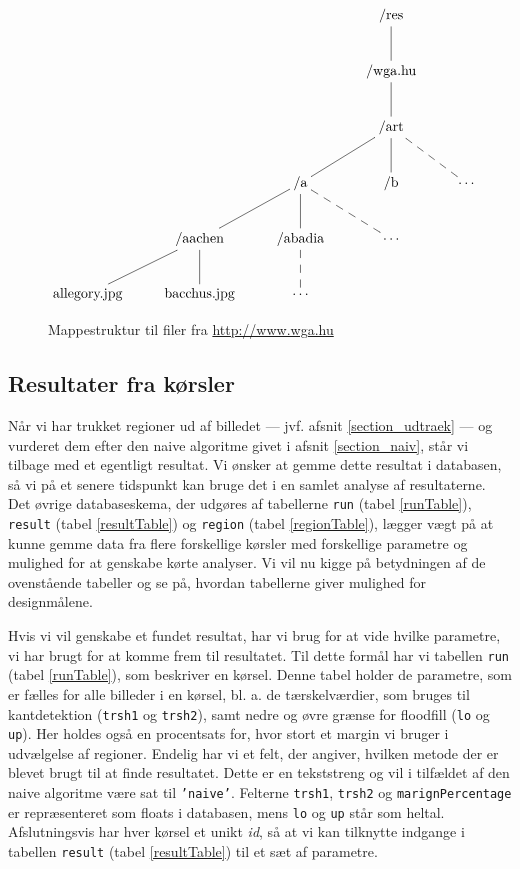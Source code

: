 {%
\begin{figure}[!h]
    \centering
$
\xymatrix{
 &  &   & \ar @{-} [d] \textrm{/res}  &                                                     \\
 &  &   & \ar @{-} [d] \textrm{/wga.hu}  &                                                  \\
 &  &   & \ar @{-} [dl] \ar @{-} [d] \ar @{--} [dr] \textrm{/art} &                         \\
 &  & \ar @{-} [dl] \ar @{-} [d] \ar @{--} [dr] \textrm{/a} & \textrm{/b} & \cdots          \\
 & \ar @{-} [dl] \ar @{-} [d] \textrm{/aachen} & \ar @{--} [d] \textrm{/abadia} & \cdots    \\
\textrm{allegory.jpg} & \textrm{bacchus.jpg} & \cdots &   &
}
$
    \caption{Mappestruktur til filer fra
        \href{http://www.wga.hu}{http://www.wga.hu}}
    \label{mappestruktur}
\end{figure}

\subsection{Resultater fra kørsler\label{section_results}}
Når vi har trukket regioner ud af billedet --- jvf. afsnit
\ref{section_udtraek} --- og vurderet dem efter den naive algoritme
givet i afsnit \ref{section_naiv}, står vi tilbage med et egentligt
resultat. Vi ønsker at gemme dette resultat i databasen, så vi på et
senere tidspunkt kan bruge det i en samlet analyse af resultaterne. Det
øvrige databaseskema, der udgøres af tabellerne \texttt{run} (tabel
\ref{runTable}), \texttt{result} (tabel \ref{resultTable}) og
\texttt{region} (tabel \ref{regionTable}), lægger vægt på at kunne gemme
data fra flere forskellige kørsler med forskellige parametre og mulighed
for at genskabe kørte analyser. Vi vil nu kigge på betydningen af de
ovenstående tabeller og se på, hvordan tabellerne giver mulighed for
designmålene.

Hvis vi vil genskabe et fundet resultat, har vi brug for at vide hvilke
parametre, vi har brugt for at komme frem til resultatet. Til dette
formål har vi tabellen \texttt{run} (tabel \ref{runTable}), som
beskriver en kørsel. Denne tabel holder de parametre, som er fælles for
alle billeder i en kørsel, bl. a. de tærskelværdier, som bruges til
kantdetektion (\texttt{trsh1} og \texttt{trsh2}), samt nedre og øvre
grænse for floodfill (\texttt{lo} og \texttt{up}). Her holdes også en
procentsats for, hvor stort et margin vi bruger i udvælgelse af
regioner. Endelig har vi et felt, der angiver, hvilken metode der er
blevet brugt til at finde resultatet. Dette er en tekststreng og vil i
tilfældet af den naive algoritme være sat til \texttt{'naive'}. Felterne
\texttt{trsh1}, \texttt{trsh2} og \texttt{marignPercentage} er
repræsenteret som floats i databasen, mens \texttt{lo} og \texttt{up}
står som heltal. Afslutningsvis har hver kørsel et unikt \emph{id}, så
at vi kan tilknytte indgange i tabellen \texttt{result} (tabel
\ref{resultTable}) til et sæt af parametre.

}
